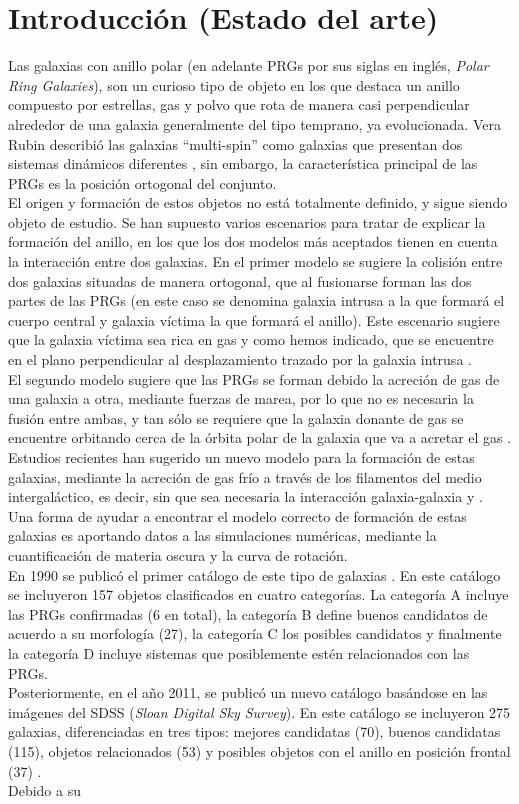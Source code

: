 \documentclass{article}
\begin{document}
\section{Introducción (Estado del arte)}
Las galaxias con anillo polar (en adelante PRGs por sus siglas en inglés, \emph{Polar Ring Galaxies}), son un curioso tipo de objeto en los que destaca un anillo compuesto por estrellas, gas y polvo que rota de manera casi perpendicular alrededor de una galaxia generalmente del tipo temprano, ya evolucionada. Vera Rubin describió las galaxias ``multi-spin'' como galaxias que presentan dos sistemas dinámicos diferentes \cite{Rubin1994d}, sin embargo, la característica principal de las PRGs es la posición ortogonal del conjunto.\\El origen y formación de estos objetos no está totalmente definido, y sigue siendo objeto de estudio. Se han supuesto varios escenarios para tratar de explicar la formación del anillo, en los que los dos modelos más aceptados tienen en cuenta la interacción entre dos galaxias. En el primer modelo se sugiere la colisión entre dos galaxias situadas de manera ortogonal, que al fusionarse forman las dos partes de las PRGs (en este caso se denomina galaxia intrusa a la que formará el cuerpo central y galaxia víctima la que formará el anillo). Este escenario sugiere que la galaxia víctima sea rica en gas y como hemos indicado, que se encuentre en el plano perpendicular al desplazamiento trazado por la galaxia intrusa \cite{Bournaud2003}.\\El segundo modelo sugiere que las PRGs se forman debido la acreción de gas de una galaxia a otra, mediante fuerzas de marea, por lo que no es necesaria la fusión entre ambas, y tan sólo se requiere que la galaxia donante de gas se encuentre orbitando cerca de la órbita polar de la galaxia que va a acretar el gas \cite{Bournaud2003}. Estudios recientes han sugerido un nuevo modelo para la formación de estas galaxias, mediante la acreción de gas frío a través de los filamentos del medio intergaláctico, es decir, sin que sea necesaria la interacción galaxia-galaxia \cite{Brook2008} y \cite{Iodice2014}. Una forma de ayudar a encontrar el modelo correcto de formación de estas galaxias es aportando datos a las simulaciones numéricas, mediante la cuantificación de materia oscura y la curva de rotación.\\En 1990 se publicó el primer catálogo de este tipo de galaxias \cite{Whitmore1990}. En este catálogo se incluyeron 157 objetos clasificados en cuatro categorías. La categoría A incluye las PRGs confirmadas (6 en total), la categoría B define buenos candidatos de acuerdo a su morfología (27), la categoría C los posibles candidatos y finalmente la categoría D incluye sistemas que posiblemente estén relacionados con las PRGs.\\Posteriormente, en el año 2011, se publicó un nuevo catálogo basándose en las imágenes del SDSS (\emph{Sloan Digital Sky Survey}). En este catálogo se incluyeron 275 galaxias, diferenciadas en tres tipos: mejores candidatas (70), buenos candidatas (115), objetos relacionados (53) y posibles objetos con el anillo en posición frontal (37) \cite{Moiseev2011a}.\\Debido a su 
\end{document}

